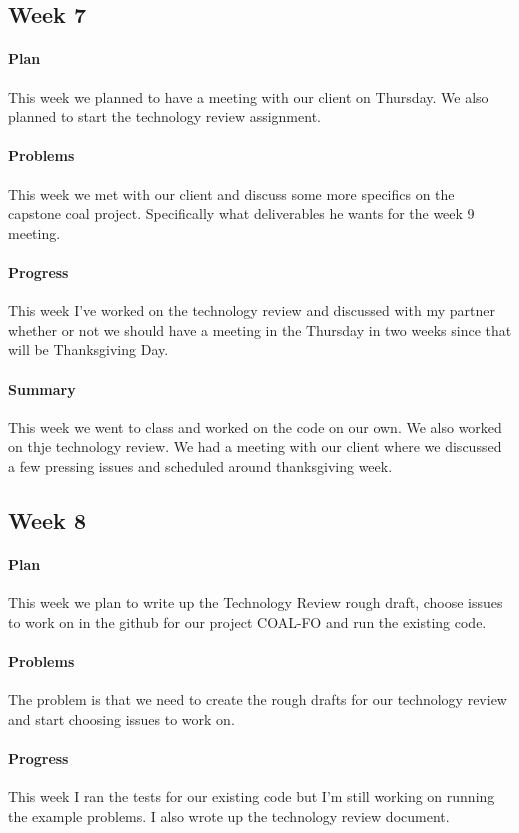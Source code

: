 \documentclass[onecolumn, draftclsnofoot,10pt, compsoc]{IEEEtran}
\begin{document}
\subsection{Week 7}
\paragraph{Plan}
This week we planned to have a meeting with our client on Thursday.  We also planned to start the technology review assignment.
\paragraph{Problems}
This week we met with our client and discuss some more specifics on the capstone coal project. Specifically what deliverables he wants for the week 9 meeting.
\paragraph{Progress}
This week I've worked on the technology review and discussed with my partner whether or not we should have a meeting in the Thursday in two weeks since that will be Thanksgiving Day.
\paragraph{Summary}
This week we went to class and worked on the code on our own. We also worked on thje technology review. We had a meeting with our client where we discussed a few pressing issues and scheduled around thanksgiving week.

\subsection{Week 8}
\paragraph{Plan}
This week we plan to write up the Technology Review rough draft, choose issues to work on in the github for our project COAL-FO and run the existing code.
\paragraph{Problems}
The problem is that we need to create the rough drafts for our technology review and start choosing issues to work on.
\paragraph{Progress}
This week I ran the tests for our existing code but I'm still working on running the example problems. I also wrote up the technology review document.
\end{document}
